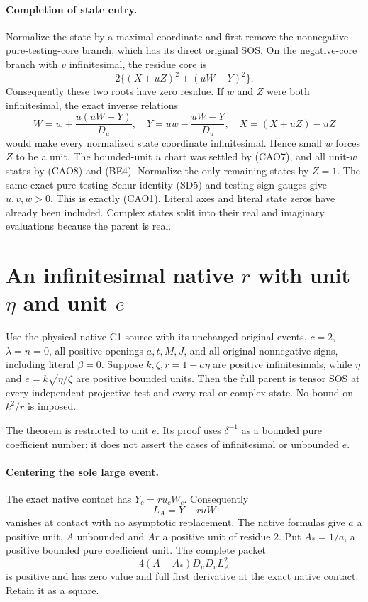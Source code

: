 \paragraph{Completion of state entry.}
Normalize the state by a maximal coordinate and first remove the
nonnegative pure-testing-core branch, which has its direct original
SOS. On the negative-core branch with $v$ infinitesimal, the residue
core is
\[
 2\{(X+uZ)^2+(uW-Y)^2\}.
\]
Consequently these two roots have zero residue. If $w$ and $Z$ were
both infinitesimal, the exact inverse relations
\[
 W=w+\frac{u(uW-Y)}{D_u},\quad
 Y=uw-\frac{uW-Y}{D_u},\quad X=(X+uZ)-uZ
\]
would make every normalized state coordinate infinitesimal. Hence
small $w$ forces $Z$ to be a unit. The bounded-unit $u$ chart was
settled by (CAO7), and all unit-$w$ states by (CAO8) and (BE4).
Normalize the only remaining states by $Z=1$. The same exact
pure-testing Schur identity (SD5) and testing sign gauges give
$u,v,w>0$. This is exactly (CAO1). Literal axes and literal state
zeros have already been included. Complex states split into their
real and imaginary evaluations because the parent is real.



\section{\texorpdfstring{An infinitesimal native $r$ with unit $\eta$ and unit $e$}{An infinitesimal native r with unit eta and unit e}}
\label{component:p3763434080c2}


\begin{theorem}
Use the physical native C1 source with its unchanged original events,
$c=2$, $\lambda=n=0$, all positive openings $a,t,M,J$, and all original
nonnegative signs, including literal $\beta=0$.
Suppose $k,\zeta,r=1-a\eta$ are positive infinitesimals, while
$\eta$ and $e=k\sqrt{\eta/\zeta}$ are positive bounded units.
Then the full parent is tensor SOS at every independent projective test
and every real or complex state. No bound on $k^2/r$ is imposed.
\end{theorem}

The theorem is restricted to unit $e$. Its proof uses $\delta^{-1}$
as a bounded pure coefficient number; it does not assert the cases of
infinitesimal or unbounded $e$.

\paragraph{Centering the sole large event.}
The exact native contact has $Y_c=r u_cW_c$. Consequently
\[
 L_A=Y-r uW
\]
vanishes at contact with no asymptotic replacement. The native formulas
give $a$ a positive unit, $A$ unbounded and $Ar$ a positive unit of
residue $2$. Put $A_*=1/a$, a positive bounded pure coefficient unit.
The complete packet
\[
             4(A-A_*)D_uD_v L_A^2                         \tag{CA1}
\]
is positive and has zero value and full first derivative at the exact
native contact. Retain it as a square.

